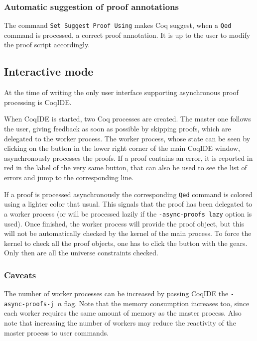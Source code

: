 \subsubsection{Automatic suggestion of proof annotations}

The command \texttt{Set Suggest Proof Using} makes Coq suggest, when a
\texttt{Qed} command is processed, a correct proof annotation. It is up
to the user to modify the proof script accordingly.

\subsection{Interactive mode}

At the time of writing the only user interface supporting asynchronous proof
processing is CoqIDE.

When CoqIDE is started, two Coq processes are created.  The master one follows
the user, giving feedback as soon as possible by skipping proofs, which are
delegated to the worker process.  The worker process, whose state can be seen
by clicking on the button in the lower right corner of the main CoqIDE window,
asynchronously processes the proofs.  If a proof contains an error, it is
reported in red in the label of the very same button, that can also be used to
see the list of errors and jump to the corresponding line.

If a proof is processed asynchronously the corresponding \texttt{Qed} command
is colored using a lighter color that usual.  This signals that
the proof has been delegated to a worker process (or will be processed
lazily if the \texttt{-async-proofs lazy} option is used). Once finished, the
worker process will provide the proof object, but this will not be
automatically checked by the kernel of the main process. To force
the kernel to check all the proof objects, one has to click the button
with the gears. Only then are all the universe constraints checked.

\subsubsection{Caveats}

The number of worker processes can be increased by passing CoqIDE the
\texttt{-async-proofs-j $n$} flag.  Note that the memory consumption
increases too, since each worker requires the same amount of memory as
the master process. Also note that increasing the number of workers may
reduce the reactivity of the master process to user commands.


